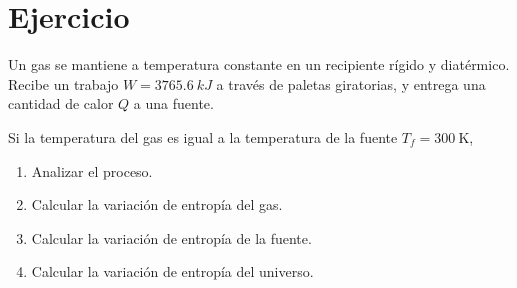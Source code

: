 \section{Ejercicio}\label{ej:Chap07Ejercicio21}
Un gas se mantiene a temperatura constante en un recipiente rígido y diatérmico. Recibe un trabajo $W=\SI{3765.6}{kJ}$ a través de paletas giratorias, y entrega una cantidad de calor $Q$ a una fuente.

Si la temperatura del gas es igual a la temperatura de la fuente $T_f=\SI{300}{\kelvin}$,
\begin{enumerate}
    \item Analizar el proceso.
    \item Calcular la variación de entropía del gas.
    \item Calcular la variación de entropía de la fuente.
    \item Calcular la variación de entropía del universo.
\end{enumerate}